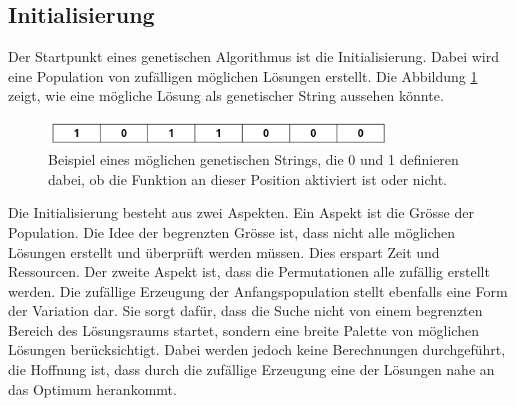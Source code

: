 %
%
%
%
\subsection{Initialisierung
\label{buch:paper:varalg:subsection:initialization}}
Der Startpunkt eines genetischen Algorithmus ist die Initialisierung.
Dabei wird eine Population von zufälligen möglichen Lösungen erstellt.
Die Abbildung \ref{fig:possible_genetic_string} zeigt, wie eine mögliche
Lösung als genetischer String aussehen könnte.
\begin{figure}
	\centering
	\includegraphics[width=0.8\textwidth]{
        papers/varalg/images/teil3/01GeneticString.png
        }
	\caption{
		Beispiel eines möglichen genetischen Strings, die 0 und 1 definieren dabei,
		ob die Funktion an dieser Position aktiviert ist oder nicht.
		}
	\label{fig:possible_genetic_string}
\end{figure}
Die Initialisierung besteht aus zwei Aspekten. Ein Aspekt ist die Grösse
der Population. Die Idee der begrenzten Grösse ist, dass nicht alle möglichen
Lösungen erstellt und überprüft werden müssen. Dies erspart Zeit und Ressourcen.
Der zweite Aspekt ist, dass die Permutationen alle zufällig erstellt werden.
Die zufällige Erzeugung der Anfangspopulation stellt ebenfalls eine Form 
der Variation dar. Sie sorgt dafür, dass die Suche nicht von einem begrenzten 
Bereich des Lösungsraums startet, sondern eine breite Palette von möglichen 
Lösungen berücksichtigt. Dabei werden jedoch keine Berechnungen durchgeführt,
die Hoffnung ist, dass durch die zufällige Erzeugung eine der Lösungen nahe
an das Optimum herankommt.

